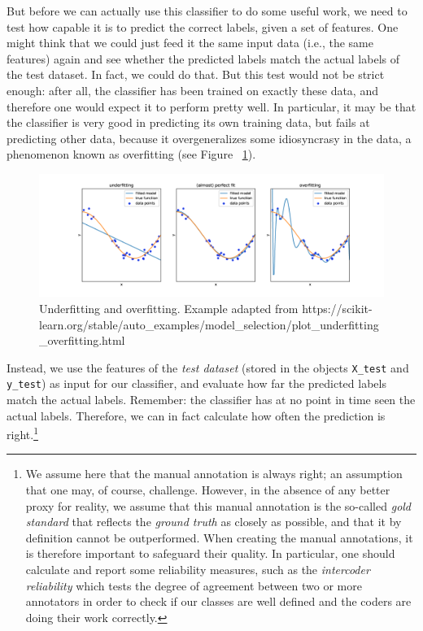 But before we can actually use this classifier to do some useful work, we need to test how capable it  is to predict the
correct labels, given a set of features. One might think that we could
just feed it the same input data (i.e., the same features) again and
see whether the predicted labels match the actual labels of the test
dataset.  In fact, we could do that.  But this test would not be
strict enough: after all, the classifier has been trained on exactly
these data, and therefore one would expect it to perform pretty well.
In particular, it may be that the classifier is very good in
predicting its own training data, but fails at predicting other data,
because it overgeneralizes some idiosyncrasy in the data, a phenomenon
known as overfitting (see Figure ~\ref{fig:overfit}).

\begin{figure}
\centering
\includegraphics[width=\linewidth]{figures/ch09_overfitting.png}
\caption{Underfitting and overfitting. Example adapted from https://scikit-learn.org/stable/auto\_examples/model\_selection/plot\_underfitting\_overfitting.html}
\label{fig:overfit}
\end{figure}

Instead, we use the features of the \emph{test dataset} (stored in the objects  \texttt{X\_test} and \texttt{y\_test})  as input for
our classifier, and evaluate  how far the predicted labels match the
actual labels.  Remember: the classifier has at no point in time seen
the actual labels.  Therefore, we can in fact calculate how often the
prediction is right.\footnote{We assume here that the manual annotation
  is always right; an assumption that one may, of course,
  challenge. However, in the absence of any better proxy for reality,
  we assume that this manual annotation is the so-called \emph{gold
    standard} that reflects the \emph{ground truth} as closely as
  possible, and that it by definition cannot be outperformed. When creating the manual annotations, it is therefore important to safeguard their quality. In particular, one  should calculate and report some reliability measures, such as the \emph{intercoder reliability} which tests the degree of agreement between two or more annotators in order to check if our classes are well defined and the coders are doing their work correctly.}

